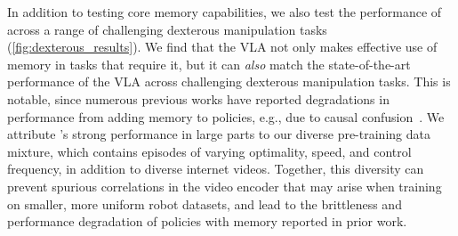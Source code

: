 In addition to testing core memory capabilities, we also test the performance of \Acronym{} across a range of challenging dexterous manipulation tasks (\cref{fig:dexterous_results}). We find that the \Acronym{} VLA not only makes effective use of memory in tasks that require it, but it can \emph{also} match the state-of-the-art performance of the \pizerosix{} VLA across challenging dexterous manipulation tasks. This is notable, since numerous previous works have reported degradations in performance from adding memory to policies, e.g., due to causal confusion~\citep{chi2025diffusion, zheng2024tracevla}. We attribute \Acronym{}'s strong performance in large parts to our diverse pre-training data mixture, which contains episodes of varying optimality, speed, and control frequency, in addition to diverse internet videos. Together, this diversity can prevent spurious correlations in the video encoder that may arise when training on smaller, more uniform robot datasets, and lead to the brittleness and performance degradation of policies with memory reported in prior work. %






















